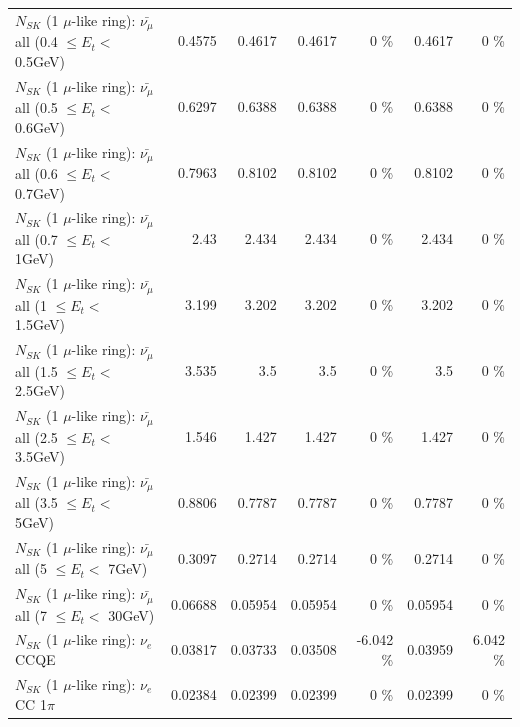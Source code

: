 \begin{table}
\begin{tabular}{| l | r | r | r  r | r  r |}
 $N_{SK}$ (1 $\mu$-like ring): $\bar{\nu_{\mu}}$ all (0.4 $\leq E_{t} <$ 0.5GeV) &          0.4575 &          0.4617 &          0.4617 &        0 \%  &          0.4617 &        0 \%  \\ 
 $N_{SK}$ (1 $\mu$-like ring): $\bar{\nu_{\mu}}$ all (0.5 $\leq E_{t} <$ 0.6GeV) &          0.6297 &          0.6388 &          0.6388 &        0 \%  &          0.6388 &        0 \%  \\ 
 $N_{SK}$ (1 $\mu$-like ring): $\bar{\nu_{\mu}}$ all (0.6 $\leq E_{t} <$ 0.7GeV) &          0.7963 &          0.8102 &          0.8102 &        0 \%  &          0.8102 &        0 \%  \\ 
   $N_{SK}$ (1 $\mu$-like ring): $\bar{\nu_{\mu}}$ all (0.7 $\leq E_{t} <$ 1GeV) &            2.43 &           2.434 &           2.434 &        0 \%  &           2.434 &        0 \%  \\ 
   $N_{SK}$ (1 $\mu$-like ring): $\bar{\nu_{\mu}}$ all (1 $\leq E_{t} <$ 1.5GeV) &           3.199 &           3.202 &           3.202 &        0 \%  &           3.202 &        0 \%  \\ 
 $N_{SK}$ (1 $\mu$-like ring): $\bar{\nu_{\mu}}$ all (1.5 $\leq E_{t} <$ 2.5GeV) &           3.535 &             3.5 &             3.5 &        0 \%  &             3.5 &        0 \%  \\ 
 $N_{SK}$ (1 $\mu$-like ring): $\bar{\nu_{\mu}}$ all (2.5 $\leq E_{t} <$ 3.5GeV) &           1.546 &           1.427 &           1.427 &        0 \%  &           1.427 &        0 \%  \\ 
   $N_{SK}$ (1 $\mu$-like ring): $\bar{\nu_{\mu}}$ all (3.5 $\leq E_{t} <$ 5GeV) &          0.8806 &          0.7787 &          0.7787 &        0 \%  &          0.7787 &        0 \%  \\ 
     $N_{SK}$ (1 $\mu$-like ring): $\bar{\nu_{\mu}}$ all (5 $\leq E_{t} <$ 7GeV) &          0.3097 &          0.2714 &          0.2714 &        0 \%  &          0.2714 &        0 \%  \\ 
    $N_{SK}$ (1 $\mu$-like ring): $\bar{\nu_{\mu}}$ all (7 $\leq E_{t} <$ 30GeV) &         0.06688 &         0.05954 &         0.05954 &        0 \%  &         0.05954 &        0 \%  \\ 
\hline
\hline
\hline
                                      $N_{SK}$ (1 $\mu$-like ring): $\nu_e$ CCQE &         0.03817 &         0.03733 &         0.03508 &   -6.042 \%  &         0.03959 &    6.042 \%  \\ 
                                 $N_{SK}$ (1 $\mu$-like ring): $\nu_e$ CC 1$\pi$ &         0.02384 &         0.02399 &         0.02399 &        0 \%  &         0.02399 &        0 \%  \\ 

\end{tabular}
\end{table}
